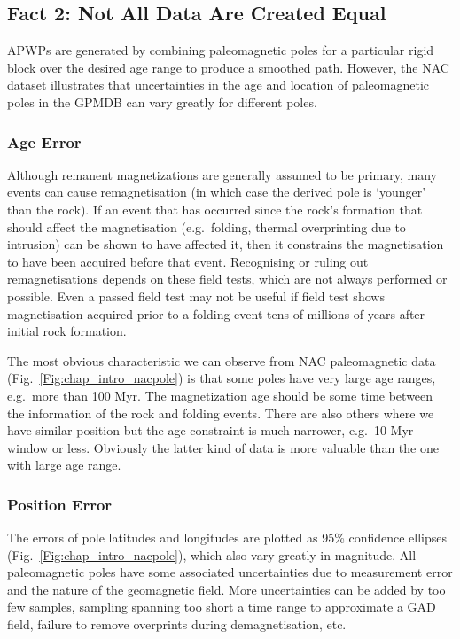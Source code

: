 \subsection{Fact 2: Not All Data Are Created Equal}

APWPs are generated by combining paleomagnetic poles for a particular rigid
block over the desired age range to produce a smoothed path. However, the NAC
dataset illustrates that uncertainties in the age and location of paleomagnetic
poles in the GPMDB can vary greatly for different poles.

\subsubsection{Age Error}

Although remanent magnetizations are generally assumed to be primary, many
events can cause remagnetisation (in which case the derived pole is `younger'
than the rock). If an event that has occurred since the rock's formation that
should affect the magnetisation (e.g.\ folding, thermal overprinting due to
intrusion) can be shown to have affected it, then it constrains the
magnetisation to have been acquired before that event. Recognising or ruling
out remagnetisations depends on these field tests, which are not always
performed or possible. Even a passed field test may not be useful if field test
shows magnetisation acquired prior to a folding event tens of millions of years
after initial rock formation.

The most obvious characteristic we can observe from NAC paleomagnetic data
(Fig.~\ref{Fig:chap_intro_nacpole}) is that some poles have very large age
ranges, e.g.\ more than 100 Myr. The magnetization age should be some time
between the information of the rock and folding events. There are also others
where we have similar position but the age constraint is much narrower, e.g.\ 10
Myr window or less. Obviously the latter kind of data is more valuable than the
one with large age range.

\subsubsection{Position Error}

The errors of pole latitudes and longitudes are plotted as 95\% confidence
ellipses (Fig.~\ref{Fig:chap_intro_nacpole}), which also vary greatly in magnitude.
All paleomagnetic poles have some associated uncertainties due to measurement
error and the nature of the geomagnetic field. More uncertainties can be added
by too few samples, sampling spanning too short a time range to approximate a
GAD field, failure to remove overprints during demagnetisation, etc.

